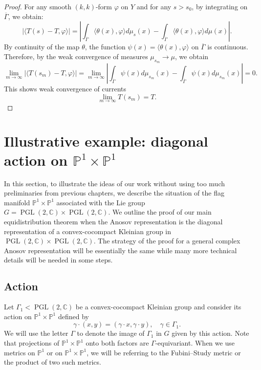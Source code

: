 \documentclass[12pt]{amsbook}%
\theoremstyle{definition}
\theoremstyle{remark}
\numberwithin{section}{chapter}
\numberwithin{subsection}{section}
\numberwithin{figure}{chapter}
\DeclareMathOperator{\PGL}{PGL}
\def\bC{{\mathbb{C}}}
\def\bH{{\mathbb{H}}}
\def\bP{{\mathbb{P}}}
\def\Ga{\Gamma}
\def\ol{\overline}
\def\kap{}
\begin{document}
{{\begin{proof}
\medskip
For any smooth $(k,k)$-form $\varphi$ on $Y$ and for any $s > s_0$, by integrating on $\ol\Gamma$, we obtain:  
$$
\left | \langle T(s) - T , \varphi \rangle \right |  
= \left | \int_{\ol\Gamma}\langle\theta(x),\varphi \rangle d\mu_{s}(x) -  \int_{\ol\Gamma}\langle\theta(x),\varphi \rangle d\mu(x)  \right |. 
$$
By continuity of the map $\theta$, the function $\psi(x)= \langle\theta(x),\varphi\rangle$ on $\ol{\Ga}$ is continuous. Therefore, by the weak convergence of measures $\mu_{s_m}\to \mu$, we obtain
$$
\lim_{m\to\infty} \left  | \langle T(s_m) - T , \varphi \rangle \right | = \lim_{m\to\infty} \left| 
\int_{\ol\Gamma} \psi(x) d\mu_{s_m}(x) - \int_{\ol\Gamma} \psi(x) d\mu_{s_m}(x) \right |=0. 
$$
This shows weak convergence of currents 
 \begin{equation*}
\lim_{m\rightarrow \infty} T(s_{m}) = T.  
\end{equation*}  
 \end{proof}



\section{Illustrative example: diagonal action on $\bP^1\times \bP^1$}





In this section, to illustrate the ideas of our work without using too much preliminaries from previous chapters, we describe the situation of the flag manifold $\bP^1\times \bP^1$ associated with the Lie group $G=\PGL(2,\bC)\times \PGL(2,\bC)$. We  outline the proof of our main equidistribution theorem when the Anosov representation is the diagonal representation of a convex-cocompact Kleinian group in $\PGL(2,\bC)\times \PGL(2,\bC)$. The strategy of the proof for a general complex Anosov representation will be essentially the same while many more technical details will be needed in some steps. 

\subsection{Action}

Let $\Gamma_1< \PGL(2,\bC)$ be a convex-cocompact Kleinian group and consider its action on $\bP^1\times \bP^1$ defined by 
\[\gamma\cdot(x,y)=(\gamma\cdot x, \gamma\cdot y),\quad \gamma\in \Gamma_1.\]
We will use the letter $\Ga$ to denote the image of $\Gamma_1$ in $G$ given by this action. 
Note that projections of $\bP^1\times \bP^1$ onto both factors are $\Gamma$-equivariant. When we use metrics on $\bP^1$ or on $\bP^1\times \bP^1$, we will be referring to the Fubini--Study metric or the product of two such metrics. 

}}
\end{document}
